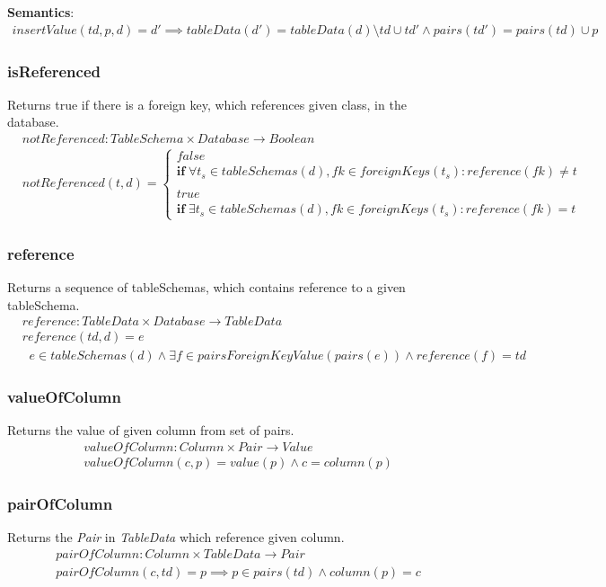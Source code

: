 \documentclass[10pt]{article}
\begin{document}
\textbf{Semantics}:
\begin{align}
insertValue(td, p, d) = d' \implies tableData(d') = tableData(d) \setminus td \cup td' \land pairs(td') = pairs(td) \cup p 
\end{align}


\subsubsection{isReferenced}
Returns true if there is a foreign key, which references given class, in the database.
\begin{align}
& notReferenced: TableSchema \times Database \rightarrow Boolean \\
& notReferenced(t, d) = \begin{cases}
 false \\
 \mathbf{if} \; \forall t_s \in tableSchemas(d), fk \in foreignKeys(t_s) : reference(fk) \neq t \\\\
 true \\
 \mathbf{if} \;  \exists t_s \in tableSchemas(d), fk \in foreignKeys(t_s) : reference(fk) = t
 \end{cases}
\end{align}

\subsubsection{reference}
Returns a sequence of tableSchemas, which contains reference to a given tableSchema.
\begin{align}
& reference: TableData \times Database \rightarrow TableData \\
& reference(td, d) = e \\
& \;\; e \in tableSchemas(d) \land \exists f \in pairsForeignKeyValue(pairs(e)) \land reference(f) = td  
\end{align}


\subsubsection{valueOfColumn}
Returns the value of given column from set of pairs.
\begin{align}
& valueOfColumn: Column \times Pair \rightarrow Value \\
& valueOfColumn(c, p) = value(p) \land c = column(p)
\end{align}

\subsubsection{pairOfColumn}
Returns the \emph{Pair} in \emph{TableData} which reference given column.
\begin{align}
& pairOfColumn: Column \times TableData \rightarrow Pair \\
& pairOfColumn(c, td) = p \implies p \in pairs(td) \land column(p) = c
\end{align}
\end{document}

